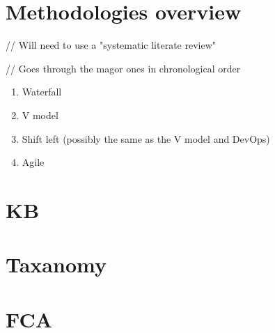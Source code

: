 \section{Methodologies overview}
// Will need to use a "systematic literate review"

// Goes through the magor ones in chronological order

\begin{enumerate}
  \item Waterfall
  \item V model
  \item Shift left (possibly the same as the V model and DevOps)
  \item Agile
\end{enumerate}

\section{KB}
\section{Taxanomy}
\section{FCA}
